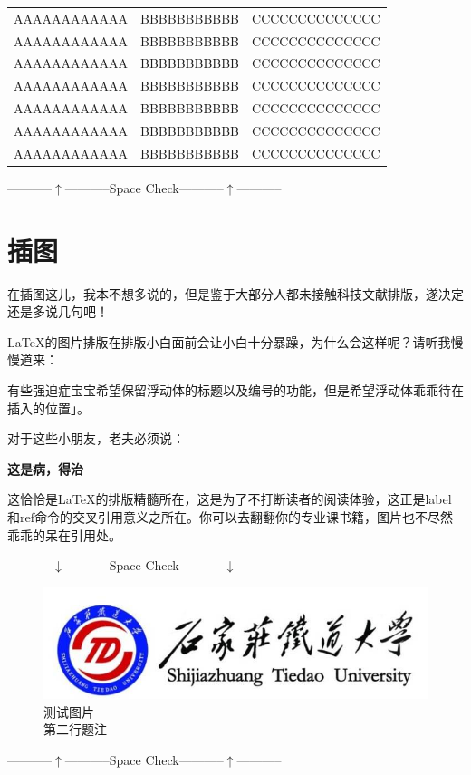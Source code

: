 \begin{longtable}[h]{ccc}
  AAAAAAAAAAAA   &   BBBBBBBBBBB   &   CCCCCCCCCCCCCC   \\
  AAAAAAAAAAAA   &   BBBBBBBBBBB   &   CCCCCCCCCCCCCC   \\
  AAAAAAAAAAAA   &   BBBBBBBBBBB   &   CCCCCCCCCCCCCC   \\
  AAAAAAAAAAAA   &   BBBBBBBBBBB   &   CCCCCCCCCCCCCC   \\
  AAAAAAAAAAAA   &   BBBBBBBBBBB   &   CCCCCCCCCCCCCC   \\
  AAAAAAAAAAAA   &   BBBBBBBBBBB   &   CCCCCCCCCCCCCC   \\
  AAAAAAAAAAAA   &   BBBBBBBBBBB   &   CCCCCCCCCCCCCC   \\
\end{longtable}

\centerline{-----------$\uparrow$-----------Space Check-----------$\uparrow$-----------}


\section{插图}

在插图这儿，我本不想多说的，但是鉴于大部分人都未接触科技文献排版，遂决定还是多说几句吧！

\LaTeX 的图片排版在排版小白面前会让小白十分暴躁，为什么会这样呢？请听我慢慢道来：

有些强迫症宝宝希望保留浮动体的标题以及编号的功能，但是希望浮动体乖乖待在插入的位置」。

对于这些小朋友，老夫必须说：
\begin{center}
	 \kaishu \bfseries
	{\color{red}这是病，得治}
\end{center}

这恰恰是\LaTeX 的排版精髓所在，这是为了不打断读者的阅读体验，这正是label和ref命令的交叉引用意义之所在。你可以去翻翻你的专业课书籍，图片也不尽然乖乖的呆在引用处。

\centerline{-----------$\downarrow$-----------Space Check-----------$\downarrow$-----------}
\begin{figure}[!h]
  \centering
  \includegraphics[width=.5\textwidth]{pic/logo-std.jpg}
  \caption{测试图片\\第二行题注}
  \label{fig:logo}
\end{figure}
\centerline{-----------$\uparrow$-----------Space Check-----------$\uparrow$-----------}

